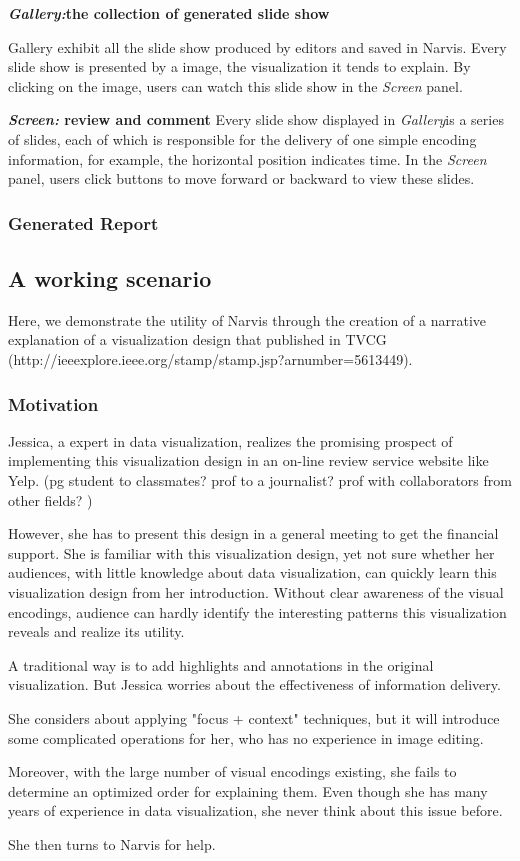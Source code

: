 \textbf{\textit{Gallery:}the collection of generated slide show}
 
Gallery exhibit all the slide show produced by editors and saved in Narvis. Every slide show is presented by a image, the visualization it tends to explain. By clicking on the image, users can watch this slide show in the \textit{Screen} panel. 

\textbf{\textit{Screen:}  review and comment}
Every slide show displayed in \textit{Gallery}is a series of slides, each of which is responsible for the delivery of one simple encoding information, for example, the horizontal position indicates time. In the \textit{Screen} panel, users click buttons to move forward or backward to view these slides. 
\subsubsection{Generated Report}

\subsection{A working scenario}
Here, we demonstrate the utility of Narvis through the creation of a narrative explanation of a visualization design that published in TVCG (http://ieeexplore.ieee.org/stamp/stamp.jsp?arnumber=5613449). 
\subsubsection{Motivation}Jessica, a expert in data visualization, realizes the promising prospect of implementing this visualization design in an on-line review service website like Yelp. (pg student to classmates? prof to a journalist? prof with collaborators from other fields?  )\par
However, she has to present this design in a general meeting to get the financial support. She is familiar with this visualization design, yet not sure whether her audiences, with little knowledge about data visualization, can quickly learn this visualization design from her introduction. Without clear awareness of the visual encodings, audience can hardly identify the interesting patterns this visualization reveals and realize its utility.  \par
A traditional way is to add highlights and annotations in the original visualization. But Jessica worries about the effectiveness of information delivery. \par
She considers about applying "focus + context" techniques,  but it will introduce some complicated operations for her, who has no experience in image editing. \par
Moreover, with the large number of visual encodings existing, she fails to determine an optimized order for explaining them. Even though she has many years of experience in data visualization, she never think about this issue before. \par
She then turns to Narvis for help. 
